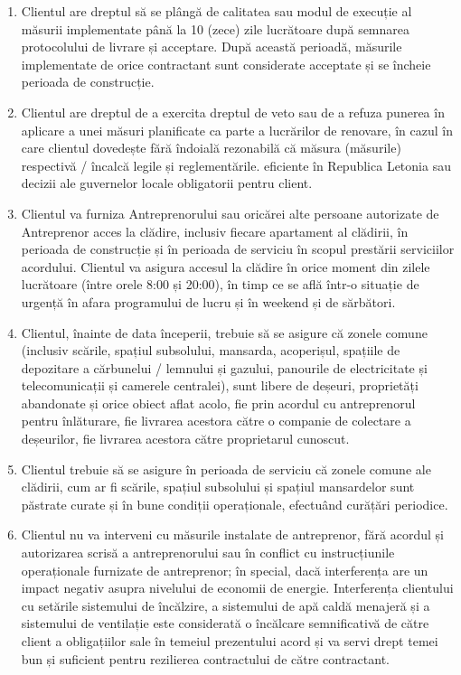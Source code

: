 \begin{multicols}{2}
\begin{enumerate}
\item Clientul are dreptul să se plângă de calitatea sau modul de execuție al măsurii implementate până la 10 (zece) zile lucrătoare după semnarea protocolului de livrare și acceptare. După această perioadă, măsurile implementate de orice contractant sunt considerate acceptate și se încheie perioada de construcție.
\item Clientul are dreptul de a exercita dreptul de veto sau de a refuza punerea în aplicare a unei măsuri planificate ca parte a lucrărilor de renovare, în cazul în care clientul dovedește fără îndoială rezonabilă că măsura (măsurile) respectivă / încalcă legile și reglementările. eficiente în Republica Letonia sau decizii ale guvernelor locale obligatorii pentru client.
\item Clientul va furniza Antreprenorului sau oricărei alte persoane autorizate de Antreprenor acces la clădire, inclusiv fiecare apartament al clădirii, în perioada de construcție și în perioada de serviciu în scopul prestării serviciilor acordului. Clientul va asigura accesul la clădire în orice moment din zilele lucrătoare (între orele 8:00 și 20:00), în timp ce se află într-o situație de urgență în afara programului de lucru și în weekend și de sărbători.
\item Clientul, înainte de data începerii, trebuie să se asigure că zonele comune (inclusiv scările, spațiul subsolului, mansarda, acoperișul, spațiile de depozitare a cărbunelui / lemnului și gazului, panourile de electricitate și telecomunicații și camerele centralei), sunt libere de deșeuri, proprietăți abandonate și orice obiect aflat acolo, fie prin acordul cu antreprenorul pentru înlăturare, fie livrarea acestora către o companie de colectare a deșeurilor, fie livrarea acestora către proprietarul cunoscut.
\item Clientul trebuie să se asigure în perioada de serviciu că zonele comune ale clădirii, cum ar fi scările, spațiul subsolului și spațiul mansardelor sunt păstrate curate și în bune condiții operaționale, efectuând curățări periodice.
\item Clientul nu va interveni cu măsurile instalate de antreprenor, fără acordul și autorizarea scrisă a antreprenorului sau în conflict cu instrucțiunile operaționale furnizate de antreprenor; în special, dacă interferența are un impact negativ asupra nivelului de economii de energie. Interferența clientului cu setările sistemului de încălzire, a sistemului de apă caldă menajeră și a sistemului de ventilație este considerată o încălcare semnificativă de către client a obligațiilor sale în temeiul prezentului acord și va servi drept temei bun și suficient pentru rezilierea contractului de către contractant.

\end{enumerate}
\end{multicols}
